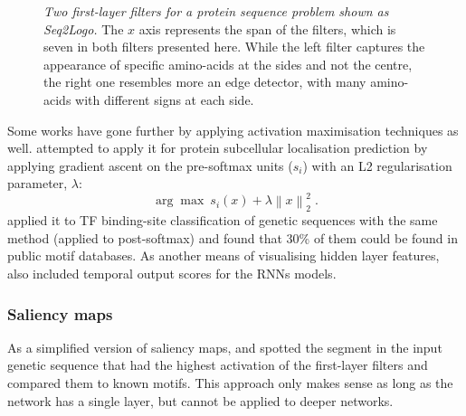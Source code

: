 \begin{figure}
	\centering
	\caption{\textit{Two first-layer filters for a protein sequence problem shown as Seq2Logo.} The $x$ axis represents the span of the filters, which is seven in both filters presented here. While the left filter captures the appearance of specific amino-acids at the sides and not the centre, the right one resembles more an edge detector, with many amino-acids with different signs at each side.}
	\label{fig:seqlogo}
\end{figure}

Some works have gone further by applying activation maximisation techniques as well. \cite{Fontal2017} attempted to apply it for protein subcellular localisation prediction by applying gradient ascent on the pre-softmax units ($s_i$) with an L2 regularisation parameter, $\lambda$:
\begin{equation}
\arg\max \: s_i(x) + \lambda \left\| x \right\|_2^2 \; .
\end{equation}
\cite{Lanchantin2016} applied it to TF binding-site classification of genetic sequences with the same method (applied to post-softmax) and found that 30\% of them could be found in public motif databases. As another means of visualising hidden layer features, \cite{Lanchantin2016} also included temporal output scores for the RNNs models.

\subsubsection*{Saliency maps}
As a simplified version of saliency maps, \cite{Alipanahi2015} and \cite{Quang2016} spotted the segment in the input genetic sequence that had the highest activation of the first-layer filters and compared them to known motifs. This approach only makes sense as long as the network has a single layer, but cannot be applied to deeper networks.

